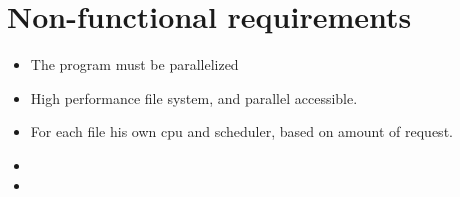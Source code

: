 {
\setcounter{funcNFR}{10}
\renewcommand{\labelitemi}{
	\ifnum \value{funcNFR}<10$/NF 0\arabic{funcNFR} /$\addtocounter{funcNFR}{10}
	\else $/NF \arabic{funcNFR} /$\addtocounter{funcNFR}{10}\fi
}

\section{Non-functional requirements}
	\begin{itemize}
		\item The program must be parallelized
		\item High performance file system, and parallel accessible.
		\item For each file his own cpu and scheduler, based on amount of request.
		\item 
		\item
	\end{itemize}
}